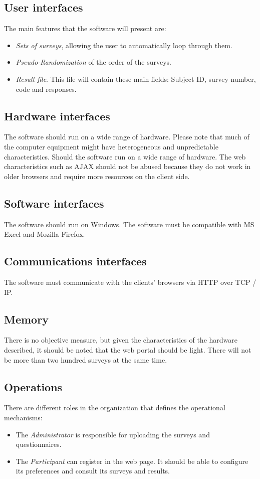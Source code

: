 \documentclass[a4paper,12pt,oneside]{report}
\begin{document}
\subsection{User interfaces}
The main features that the software will present are:
\begin{itemize}
\item {\it Sets of surveys}, allowing the user to automatically loop through them.
\item {\it Pseudo-Randomization} of the order of the surveys.
\item {\it Result file}. This file will contain these main fields: Subject ID, survey number, code and responses.
\end{itemize}

\subsection{Hardware interfaces}
The software should run on a wide range of hardware. Please note that much of the computer equipment might have heterogeneous and unpredictable characteristics. Should the software run on a wide range of hardware. The web characteristics such as AJAX should not be abused because they do not work in older browsers and require more resources on the client side.

\subsection{Software interfaces}
The software should run on Windows. The software must be compatible with MS Excel and Mozilla Firefox.

\subsection{Communications interfaces}
The software must communicate with the clients' browsers via HTTP over TCP / IP.
\subsection{Memory}
There is no objective measure, but given the characteristics of the hardware described, it should be noted that the web portal should be light. There will not be more than two hundred surveys at the same time.


\subsection{Operations}
There are different roles in the organization that defines the operational mechanisms:
\begin{itemize}
\item The {\it Administrator} is responsible for uploading the surveys and questionnaires.
\item The {\it Participant} can register in the web page. It should be able to configure its preferences and consult its surveys and results.
\end{itemize}
\end{document}
